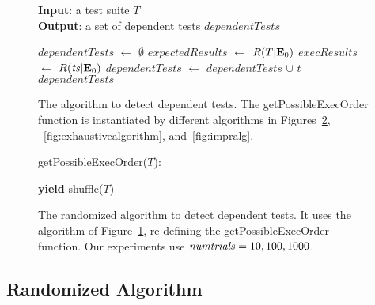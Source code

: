 \begin{figure}[t]
\textbf{Input}: a test suite $\mathit{T}$\\
\textbf{Output}: a set of dependent tests $\mathit{dependentTests}$\\
\vspace{-5mm}
\begin{algorithmic}[1]
\STATE $\mathit{dependentTests}$ $\leftarrow$ $\emptyset$
\STATE $\mathit{expectedResults}$ $\leftarrow$ $R(T|\mathbf{E}_0)$
\STATE $\mathit{execResults}$ $\leftarrow$ $R(\mathit{ts}|\mathbf{E}_0)$
\STATE $\mathit{dependentTests}$ $\leftarrow$ $\mathit{dependentTests}$ $\cup$ $\mathit{t}$
\ENDIF
\ENDFOR
\ENDFOR
\RETURN $\mathit{dependentTests}$
\end{algorithmic}


\vspace{-3mm}
\caption {The algorithm to detect dependent tests.
The getPossibleExecOrder function is instantiated
by different algorithms in Figures~\ref{fig:randalgorithm},
~\ref{fig:exhaustivealgorithm}, and~\ref{fig:impralg}.
}
\label{fig:basealgorithm}
\end{figure}


\begin{figure}[t]
getPossibleExecOrder($T$):\\
\vspace{-5mm}
\begin{algorithmic}[1]
\STATE \textbf{yield} shuffle($T$)
\ENDFOR
\end{algorithmic}

\vspace{-3mm}
\caption {The randomized algorithm to detect dependent tests.
It uses the algorithm of Figure~\ref{fig:basealgorithm}, re-defining
the getPossibleExecOrder function.
Our experiments use $\mathit{numtrials} = 10,
100, 1000$.}
\label{fig:randalgorithm}
\end{figure}


\subsection{Randomized Algorithm}
\label{sec:randomized}

